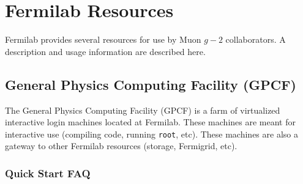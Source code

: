 \chapter{Fermilab Resources}

Fermilab provides several resources for use by Muon $g-2$ collaborators. A description and usage information are described here.

\section{General Physics Computing Facility (GPCF)}

The General Physics Computing Facility (GPCF) is a farm of virtualized interactive login machines located at Fermilab. These machines are meant for interactive use (compiling code, running \texttt{root}, etc). These machines are also a gateway to other Fermilab resources (storage, Fermigrid, etc).

\subsection{Quick Start FAQ}

